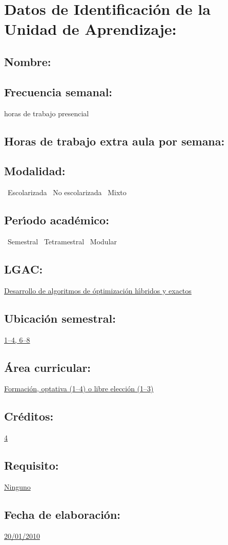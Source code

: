 \documentclass[10 pt]{article}
\begin{document}


\section{Datos de Identificaci\'{o}n de la Unidad de Aprendizaje:}
\subsection{Nombre:} 
\subsection{Frecuencia semanal:} horas de trabajo presencial 
\subsection{Horas de trabajo extra aula por semana:} 
\subsection{Modalidad:} \yes~Escolarizada \no~No escolarizada \no~Mixto
\subsection{Per\'{\i}odo acad\'{e}mico:} \yes~Semestral
\no~Tetramestral \no~Modular
\subsection{LGAC:} \underline{Desarrollo de algoritmos de \'{o}ptimizaci\'{o}n
  h\'{\i}bridos y exactos}
\subsection{Ubicaci\'{o}n semestral:} \underline{1--4, 6--8}
\subsection{\'{A}rea curricular:} \underline{Formaci\'{o}n, optativa (1--4) o libre
  elecci\'{o}n (1--3)}
\subsection{Cr\'{e}ditos:} \underline{4}
\subsection{Requisito:} \underline{Ninguno}
\subsection{Fecha de elaboraci\'{o}n:} \underline{20/01/2010}
\end{document}
